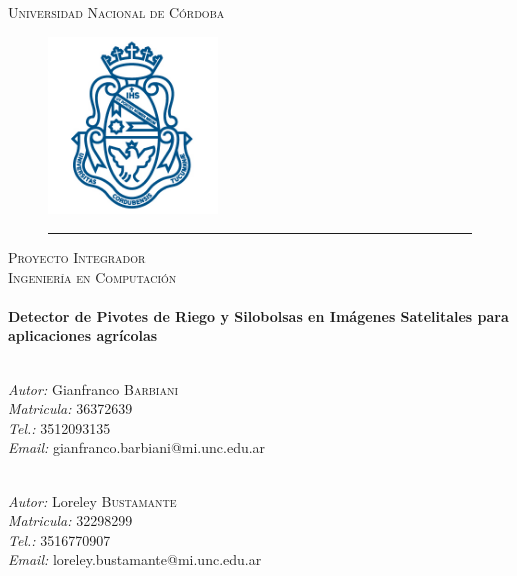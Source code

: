 
\begin{titlepage}
\begin{center}
\textsc{\LARGE Universidad Nacional de Córdoba}\\ %

\begin{figure}[htbp]
	\centering
		\includegraphics[width=0.4\textwidth]{img/logo.png}
		\rule{35em}{0.5pt}
\end{figure}

\textsc{\Large Proyecto Integrador}\\[0.5cm] %
\textsc{\Large Ingeniería en Computación}\\[0.5cm] %

\HRule \\[0.4cm] %
{\LARGE \bfseries Detector de Pivotes de Riego y Silobolsas en Imágenes Satelitales para aplicaciones agrícolas
}\\[0.2cm] %
\HRule \\[0.5cm] %

\begin{minipage}{0.49\textwidth}
\begin{flushleft} \large
\emph{Autor: }{Gianfranco \textsc{Barbiani}}\\
\emph{Matricula: }{36372639}\\
\emph{Tel.: }{3512093135}\\
\emph{Email: }{gianfranco.barbiani@mi.unc.edu.ar}\\~\\
\end{flushleft}
\end{minipage}
\begin{minipage}{0.49\textwidth}
\begin{flushleft} \large
\emph{Autor: }{Loreley \textsc{Bustamante}}\\
\emph{Matricula: }{32298299}\\
\emph{Tel.: }{3516770907}\\
\emph{Email: }{loreley.bustamante@mi.unc.edu.ar}\\~\\
\end{flushleft}
\end{minipage}


\end{center}
\end{titlepage}
